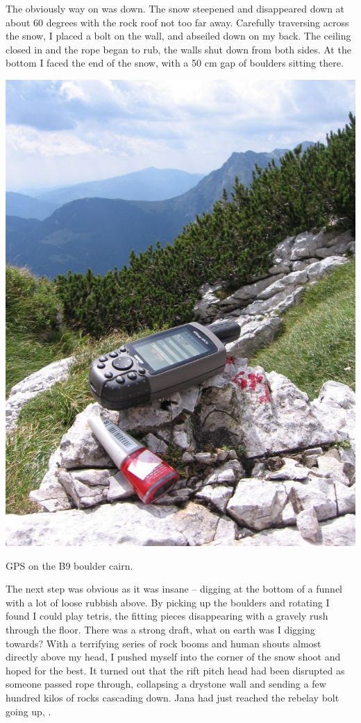 The obviously way on was down. The snow steepened and
disappeared down at about 60 degrees with the rock roof not too far
away. Carefully traversing across the snow, I placed a bolt on the wall,
and abseiled down on my back. The ceiling closed in and the rope began
to rub, the walls shut down from both sides. At the bottom I faced the
end of the snow, with a 50 cm gap of boulders sitting there.

\begin{marginfigure}
\checkoddpage \ifoddpage \forcerectofloat \else \forceversofloat \fi
\centering
 \includegraphics[width=\linewidth]{2007/b9/jarvist frost - b9 boulder cairn gps--orig.jpg} 
 \caption{GPS on the B9 boulder cairn. }
\end{marginfigure}


The next step was obvious as it was insane -- digging at the bottom of a
funnel with a lot of loose rubbish above. By picking up the boulders and
rotating I found I could play tetris, the fitting pieces disappearing
with a gravely rush through the floor. There was a strong draft, what on
earth was I digging towards? With a terrifying series of rock booms and
human shouts almost directly above my head, I pushed myself into the
corner of the snow shoot and hoped for the best. It turned out that the
rift pitch head had been disrupted as someone passed rope through,
collapsing a drystone wall and sending a few hundred kilos of rocks
cascading down. Jana had just reached the rebelay bolt going up,
.

